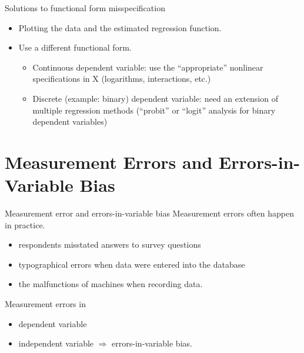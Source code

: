 \documentclass[presentation,10pt]{beamer}
\begin{document}
\begin{frame}[label={sec:orge09da65}]{Solutions to functional form misspecification}
\begin{itemize}
\item Plotting the data and the estimated regression function.
\end{itemize}

\vspace{0.1cm}

\begin{itemize}
\item Use a different functional form.
\begin{itemize}
\item Continuous dependent variable:  use the “appropriate” nonlinear
specifications in X (logarithms, interactions, etc.)
\item Discrete (example: binary) dependent variable:  need an extension of
multiple regression methods (“probit” or “logit” analysis for binary
dependent variables)
\end{itemize}
\end{itemize}
\end{frame}

\section{Measurement Errors and Errors-in-Variable Bias}
\label{sec:org98d3394}

\begin{frame}[label={sec:org3c9e060}]{Measurement error and errors-in-variable bias}
Measurement errors often happen in practice. 
\begin{itemize}
\item respondents misstated answers to survey questions
\item typographical errors when data were entered into the database
\item the malfunctions of machines when recording data.
\end{itemize}

\vspace{0.1cm}

Measurement errors in
\begin{itemize}
\item dependent variable
\item independent variable \(\Rightarrow\) \alert{errors-in-variable bias}.
\end{itemize}
\end{frame}
\end{document}
